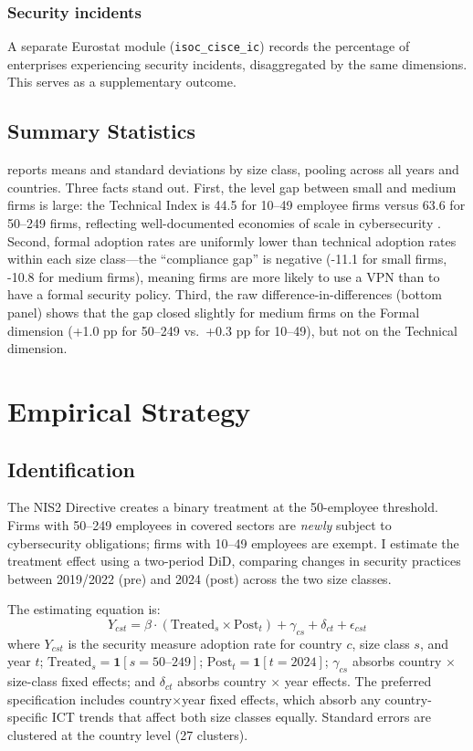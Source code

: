 \documentclass[12pt]{article}
\begin{document}
\subsubsection*{Security incidents} A separate Eurostat module (\texttt{isoc\_cisce\_ic}) records the percentage of enterprises experiencing security incidents, disaggregated by the same dimensions. This serves as a supplementary outcome.

\subsection{Summary Statistics}



 reports means and standard deviations by size class, pooling across all years and countries. Three facts stand out. First, the level gap between small and medium firms is large: the Technical Index is 44.5 for 10--49 employee firms versus 63.6 for 50--249 firms, reflecting well-documented economies of scale in cybersecurity \citep{gordon2002economics}. Second, formal adoption rates are uniformly lower than technical adoption rates within each size class---the ``compliance gap'' is negative (-11.1 for small firms, -10.8 for medium firms), meaning firms are more likely to use a VPN than to have a formal security policy. Third, the raw difference-in-differences (bottom panel) shows that the gap closed slightly for medium firms on the Formal dimension (+1.0 pp for 50--249 vs.\ +0.3 pp for 10--49), but not on the Technical dimension.


\section{Empirical Strategy}

\subsection{Identification}

The NIS2 Directive creates a binary treatment at the 50-employee threshold. Firms with 50--249 employees in covered sectors are \textit{newly} subject to cybersecurity obligations; firms with 10--49 employees are exempt. I estimate the treatment effect using a two-period DiD, comparing changes in security practices between 2019/2022 (pre) and 2024 (post) across the two size classes.

The estimating equation is:
\begin{equation}
Y_{cst} = \beta \cdot (\text{Treated}_s \times \text{Post}_t) + \gamma_{cs} + \delta_{ct} + \epsilon_{cst}
\label{eq:did}
\end{equation}
where $Y_{cst}$ is the security measure adoption rate for country $c$, size class $s$, and year $t$; $\text{Treated}_s = \mathbf{1}[s = \text{50--249}]$; $\text{Post}_t = \mathbf{1}[t = 2024]$; $\gamma_{cs}$ absorbs country $\times$ size-class fixed effects; and $\delta_{ct}$ absorbs country $\times$ year effects. The preferred specification includes country$\times$year fixed effects, which absorb any country-specific ICT trends that affect both size classes equally. Standard errors are clustered at the country level (27 clusters).
\end{document}

